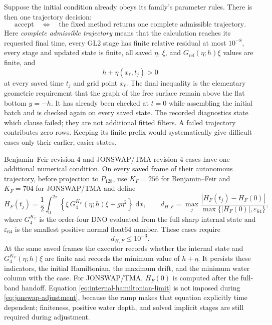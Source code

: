 \documentclass[10pt]{article}
\newcommand{\Gref}{G_{\mathrm{ref}}}
\newcommand{\dd}{\,\mathrm d}
\begin{document}
Suppose the initial condition already obeys its family's parameter rules.
There is then one trajectory decision:
\begin{equation}
  \boxed{\text{accept}
    \quad\Longleftrightarrow\quad
    \text{the fixed method returns one complete admissible trajectory}.}
  \label{eq:trajectory-acceptance}
\end{equation}
Here \emph{complete admissible trajectory} means that the calculation reaches
its requested final time, every GL2 stage has finite relative residual at
most \(10^{-8}\), every stage and updated state is finite, all saved
\(\eta\), \(\xi\), and \(\Gref(\eta;h)\xi\) values are finite, and
\[
  h+\eta(x_\ell,t_j)>0
\]
at every saved time \(t_j\) and grid point \(x_\ell\).  The final inequality
is the elementary geometric requirement that the graph of the free surface
remain above the flat bottom \(y=-h\).  It has already been checked at
\(t=0\) while assembling the initial batch and is checked again on every
saved state.  The recorded diagnostics state which clause failed; they are
not additional fitted filters.  A failed trajectory
contributes zero rows.  Keeping its finite prefix would systematically give
difficult cases only their earlier, easier states.

Benjamin--Feir revision 4 and JONSWAP/TMA revision 4 cases have one additional numerical
condition.  On every saved frame of their autonomous trajectory, before
projection to $P_{128}$, use $K_F=256$ for Benjamin--Feir and $K_F=704$ for
JONSWAP/TMA and define
\begin{equation}
  H_F(t_j)
  =\frac12\int_0^{2\pi}
    \left\{\xi\,G^{K_F}_4(\eta;h)\xi+g\eta^2\right\}\,\dd x,
  \qquad
  d_{H,F}
  =\max_j\frac{|H_F(t_j)-H_F(0)|}
                   {\max\{|H_F(0)|,\varepsilon_{64}\}},
  \label{eq:internal-hamiltonian}
\end{equation}
where $G^{K_F}_4$ is the order-four DNO evaluated from the full sharp
internal state and $\varepsilon_{64}$ is the smallest positive normal
float64 number.  These cases require
\begin{equation}
  d_{H,F}\leq10^{-3}.
  \label{eq:internal-hamiltonian-limit}
\end{equation}
At the same saved frames the executor records whether the internal state and
$G^{K_F}_4(\eta;h)\xi$ are finite and records the minimum value of
$h+\eta$.  It persists these indicators, the initial Hamiltonian, the maximum
drift, and the minimum water column with the case.  For JONSWAP/TMA,
$H_F(0)$ is computed after the full-band handoff.  Equation
\eqref{eq:internal-hamiltonian-limit} is not imposed during
\eqref{eq:jonswap-adjustment}, because the ramp makes that equation explicitly
time dependent; finiteness, positive water depth, and solved implicit stages
are still required during adjustment.
\end{document}
